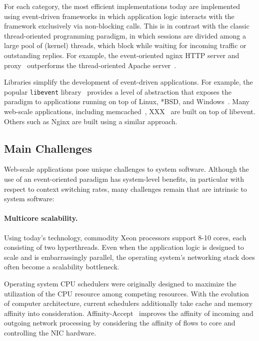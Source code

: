 For each category, the most efficient implementations today are
implemented using event-driven frameworks in which application logic
interacts with the framework exclusively via non-blocking calls.  This
is in contrast with the classic thread-oriented programming paradigm,
in which sessions are divided among a large pool of (kernel)
threads, which block while waiting for incoming traffic or outstanding
replies.  For example, the event-oriented nginx HTTP
server and proxy~\cite{reese2008nginx} outperforms the thread-oriented Apache server~\cite{misc:apache}.

Libraries simplify the development of event-driven applications.  For
example, the popular \texttt{libevent} library~\cite{provos2003libevent} provides a level of
abstraction that exposes the paradigm to applications running on top
of Linux, *BSD, and Windows~\cite{missing}.  Many web-scale
applications, including memcached~\cite{missing}, XXX~\cite{missing} are built on top
of libevent.  Others such as Nginx are built using a similar approach.


\subsection{Main Challenges}
\label{sec:motivation:challenges}

Web-scale applications pose unique challenges to system software.
Although the use of an event-oriented paradigm has system-level
benefits, in particular with respect to context switching rates, many
challenges remain that are intrinsic to system software:

\paragraph{Multicore scalability.}

Using today's technology, commodity Xeon processors support 8-10
cores, each consisting of two hyperthreads.  Even when the application
logic is designed to scale and is embarrassingly parallel, the
operating system's networking stack does often become a scalability
bottleneck.

Operating system CPU schedulers were originally designed to
maximize the utilization of the CPU resource among competing
resources.  With the evolution of computer architecture, current
schedulers additionally take cache and memory affinity into
consideration.  Affinity-Accept~\cite{DBLP:conf/eurosys/PesterevSZM12}
improves the affinity of incoming and outgoing network processing by
considering the affinity of flows to core and controlling the NIC
hardware.

